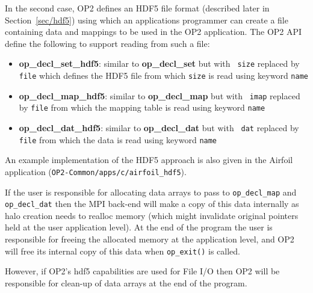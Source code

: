 \documentclass[11pt]{article}
\begin{document}
\noindent In the second case, OP2 defines an HDF5 file format (described
later in Section~\ref{sec/hdf5}) using which an applications programmer can
create a file containing data and mappings to be used in the OP2 application.
The OP2 API define the following to support reading from such a file:
\begin{itemize}
\item {\bf op\_decl\_set\_hdf5}: similar to {\bf op\_decl\_set} but with {\tt
size} replaced by {\tt file} which defines the HDF5 file from which {\tt size}
is read using keyword {\tt name}

\item {\bf op\_decl\_map\_hdf5}: similar to {\bf op\_decl\_map} but with {\tt
imap} replaced by {\tt file} from which the mapping table is read using keyword
{\tt name}

\item {\bf op\_decl\_dat\_hdf5}: similar to {\bf op\_decl\_dat} but with {\tt
dat} replaced by {\tt file} from which the data is read using keyword {\tt name}
\end{itemize}

\noindent An example implementation of the HDF5 approach is also given in the
Airfoil application (\texttt{OP2-Common/apps/c/airfoil\_hdf5}).

\noindent If the user is responsible for allocating data arrays to pass to \texttt{op\_decl\_map} and
\texttt{op\_decl\_dat} then the MPI back-end will make a copy of this data internally as halo creation needs to realloc
memory (which might invalidate original pointers held at the user application level). At the end of the program the user
is responsible for freeing the allocated memory at the application level, and OP2 will free its internal copy of this
data when \texttt{op\_exit()} is called.

\noindent However, if OP2's hdf5 capabilities are used for File I/O then OP2 will be responsible for clean-up of data
arrays at the end of the program.

\newpage


\end{document}
